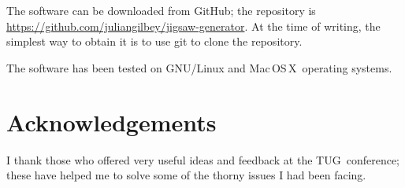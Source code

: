 \documentclass{article}
\def\MacOSX{Mac\,{\small OS\,X}}
\def\GNU{{\small GNU}}
\def\TUG{{\small TUG}}
\begin{document}
The software can be downloaded from GitHub; the repository is
\url{https://github.com/juliangilbey/jigsaw-generator}.  At the time
of writing, the simplest way to obtain it is to use git to clone the
repository.

The software has been tested on \GNU/Linux and \MacOSX\ operating
systems.

\smallskip
\section*{Acknowledgements}

I thank those who offered very useful ideas and feedback at the \TUG\
conference; these have helped me to solve some of the thorny issues I
had been facing.

\smallskip


\end{document}
